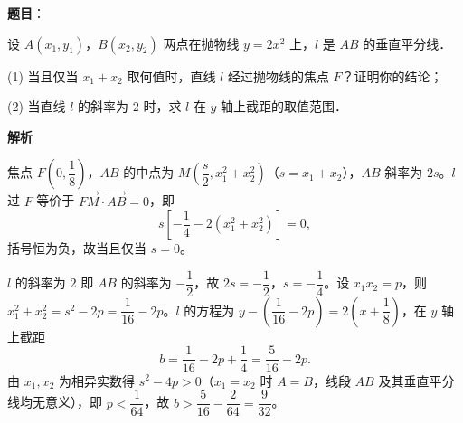 \begin{answer}

\textbf{题目}：

设 $A(x_1, y_1)$，$B(x_2, y_2)$ 两点在抛物线 $y = 2x^2$ 上，$l$ 是 $AB$ 的垂直平分线．

(1) 当且仅当 $x_1 + x_2$ 取何值时，直线 $l$ 经过抛物线的焦点 $F$？证明你的结论；

(2) 当直线 $l$ 的斜率为 $2$ 时，求 $l$ 在 $y$ 轴上截距的取值范围．

\textbf{解析}


焦点 $F\left(0, \dfrac{1}{8}\right)$，$AB$ 的中点为 $M\left(\dfrac{s}{2}, x_1^2 + x_2^2\right)$（$s = x_1 + x_2$），$AB$ 斜率为 $2s$。$l$ 过 $F$ 等价于 $\overrightarrow{FM}\cdot\overrightarrow{AB} = 0$，即
\nopagebreak[4]
\[
s\left[-\frac{1}{4} - 2\left(x_1^2 + x_2^2\right)\right] = 0,
\]
括号恒为负，故当且仅当 $s = 0$。


$l$ 的斜率为 $2$ 即 $AB$ 的斜率为 $-\dfrac{1}{2}$，故 $2s = -\dfrac{1}{2}$，$s = -\dfrac{1}{4}$。设 $x_1x_2 = p$，则 $x_1^2 + x_2^2 = s^2 - 2p = \dfrac{1}{16} - 2p$。$l$ 的方程为 $y - \left(\dfrac{1}{16} - 2p\right) = 2\left(x + \dfrac{1}{8}\right)$，在 $y$ 轴上截距
\nopagebreak[4]
\[
b = \frac{1}{16} - 2p + \frac{1}{4} = \frac{5}{16} - 2p.
\]
由 $x_1, x_2$ 为相异实数得 $s^2 - 4p > 0$（$x_1 = x_2$ 时 $A=B$，线段 $AB$ 及其垂直平分线均无意义），即 $p < \dfrac{1}{64}$，故 $b > \dfrac{5}{16} - \dfrac{2}{64} = \dfrac{9}{32}$。



\end{answer}
